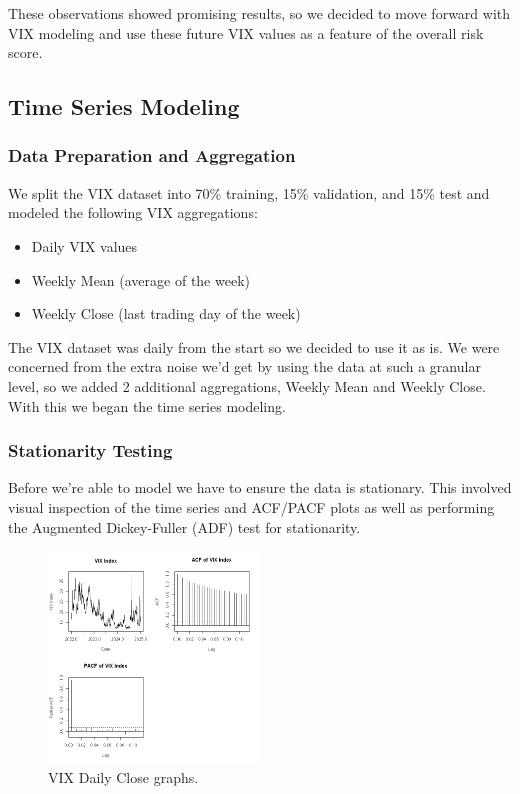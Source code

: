 \documentclass[twocolumn]{article}
\begin{document}
These observations showed promising results, so we decided to move forward with VIX modeling and use these future VIX values as a feature of the overall risk score.

\subsection{Time Series Modeling}

\subsubsection*{Data Preparation and Aggregation}

We split the VIX dataset into 70\% training, 15\% validation, and 15\% test and modeled the following VIX aggregations:

\begin{itemize}
    \item Daily VIX values
    \item Weekly Mean (average of the week)
    \item Weekly Close (last trading day of the week)
\end{itemize}

The VIX dataset was daily from the start so we decided to use it as is. We were concerned from the extra noise we'd get by using the data at such a granular level, so we added 2 additional aggregations, Weekly Mean and Weekly Close. With this we began the time series modeling.

\subsubsection*{Stationarity Testing}

Before we're able to model we have to ensure the data is stationary. This involved visual inspection of the time series and ACF/PACF plots as well as performing the Augmented Dickey-Fuller (ADF) test for stationarity. 

\begin{figure}[h!]
    \centering
    \includegraphics[width=0.5\textwidth]{vix_daily_visual_inspection.png}
    \caption{VIX Daily Close graphs.}
    \label{fig:vix-daily-visual-inspection}
\end{figure}
\end{document}
